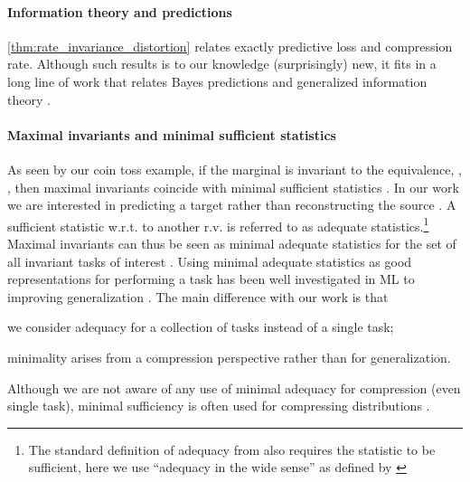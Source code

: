 \documentclass[final]{article}
\begin{document}
\paragraph{Information theory and predictions}
\cref{thm:rate_invariance_distortion} relates exactly predictive loss and compression rate.
Although such results is to our knowledge (surprisingly) new, it fits in a long line of work that relates Bayes predictions and generalized information theory \cite{degroot_uncertainty_1962,grunwald_game_2004,gneiting_strictly_2007,duchi_multiclass_2018,farnia_minimax_2016,dubois_learning_2020,xu_minimum_2020}. 


\paragraph{Maximal invariants and minimal sufficient statistics}
As seen by our coin toss example, if the marginal  is invariant to the equivalence, \ie, , then maximal invariants coincide with minimal sufficient statistics  \cite{halmos_application_1949,bahadur_sufficiency_1954}.
In our work we are interested in predicting a target  rather than reconstructing the source . 
A sufficient statistic w.r.t. to another r.v.  is referred to as adequate statistics.\footnote{The standard definition of adequacy from \citet{skibinsky_adequate_1967} also requires the statistic to be sufficient, here we use ``adequacy in the wide sense'' as defined by \citet{takeuchi_characterizations_1975}}
Maximal invariants can thus be seen as minimal adequate statistics for the set of all invariant tasks of interest .
Using minimal adequate statistics as good representations for performing a task has been well investigated in ML to improving generalization \cite{shamir_learning_2010,jiang_learning_2017,cvitkovic_minimal_2019,achille_information_2018,soatto_visual_2016,dubois_learning_2020}.
The main difference with our work is that 
\begin{inlinelist}
\item we consider adequacy for a collection of tasks instead of a single task;
\item minimality arises from a compression perspective rather than for generalization.
\end{inlinelist}
Although we are not aware of any use of minimal adequacy for compression (even single task), minimal sufficiency is often used for compressing distributions \cite{hayashi_minimum_2018,iri_fine_2019}.
\end{document}
